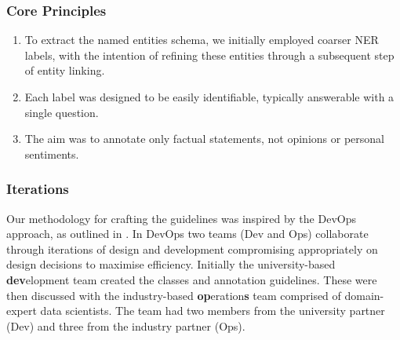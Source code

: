 \documentclass[11pt]{article}
\begin{document}
\subsubsection{Core Principles}
\begin{enumerate}
\itemsep0em
 \item To extract the named entities schema, we initially employed coarser NER labels, with the intention of refining these entities through a subsequent step of entity linking. 


 \item Each label was designed to be easily identifiable, typically answerable with a single question.

 \item  The aim was to annotate only factual statements, not opinions or personal sentiments. 
 

   
\end{enumerate}



\subsubsection{Iterations}
Our methodology for crafting the guidelines was inspired by the DevOps approach, as outlined in \citet{10.1145/2962695.2962707}. In DevOps two teams (Dev and Ops) collaborate through iterations of design and development compromising appropriately on design decisions to maximise efficiency. Initially the university-based \textbf{dev}elopment team created the classes and annotation guidelines. These were then discussed with the industry-based \textbf{op}eration\textbf{s} team comprised of domain-expert data scientists. The team had two members from the university partner (Dev) and three from the industry partner (Ops).
\end{document}
